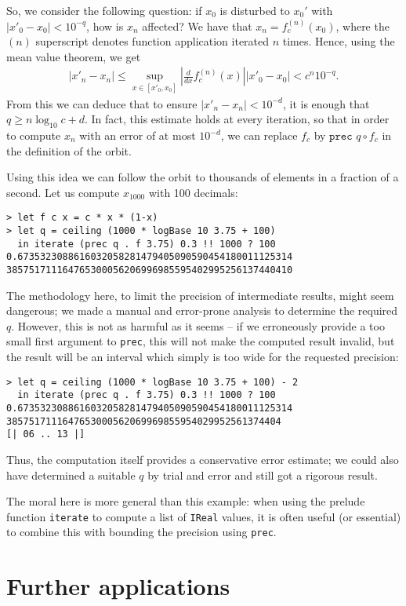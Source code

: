 \documentclass[9pt, a4, twocolumn]{article}
\begin{document}
So, we consider the following question: if $x_0$ is disturbed to $x_0'$ with
$|x'_0-x_0| < 10 ^{-q}$, how is $x_n$ affected? We have that $x_n =
f_c^{(n)}(x_0)$, where the $(n)$ superscript denotes function
application iterated $n$ times. Hence, using the mean value theorem, we get
\begin{align*}
|x'_n -
 x_n| \leq \sup_{x \in [x'_0,x_0]} \left| \frac{d}{dx}
   f_c^{(n)}(x)\right|  |x'_0 - x_0| < c^n  10 ^{-q}.    
\end{align*}
From this we can deduce that to ensure $|x'_n - x_n| < 10^{-d}$, it is
enough that $q \geq n \log_{10} c + d$. In fact, this estimate holds at
every iteration, so that in order to compute $x_n$ with an error of at
most $10^{-d}$, we can replace $f_c$ by $\texttt{prec } q \circ f_c$ in the
definition of the orbit.  

Using this idea we can follow the orbit to thousands of elements in a
fraction of a second. Let us compute $x_{1000}$ with 100 decimals:
\begin{verbatim}
> let f c x = c * x * (1-x)
> let q = ceiling (1000 * logBase 10 3.75 + 100) 
  in iterate (prec q . f 3.75) 0.3 !! 1000 ? 100
0.6735323088616032058281479405090590454180011125314
385751711164765300056206996985595402995256137440410
\end{verbatim}
The methodology here, to limit the precision of intermediate results, might 
seem dangerous; we made a manual and error-prone analysis to determine the
required $q$. However, this is not as harmful as it seems -- if we erroneously 
provide a too small first argument to \texttt{prec},  this will not make the
computed result invalid, but the result will be an interval which
simply is too wide for the requested precision:
\begin{verbatim}
> let q = ceiling (1000 * logBase 10 3.75 + 100) - 2 
  in iterate (prec q . f 3.75) 0.3 !! 1000 ? 100
0.6735323088616032058281479405090590454180011125314
3857517111647653000562069969855954029952561374404
[| 06 .. 13 |]
\end{verbatim}
Thus, the computation itself provides a conservative error estimate; 
we could also have determined a suitable $q$ by trial and error and 
still got a rigorous result.

The moral here is more general than this example:
 when using the prelude function
\texttt{iterate} to compute a list of \texttt{IReal} values, 
it is often useful (or essential) to combine this with bounding the
precision using \texttt{prec}.

\section{Further applications}
\end{document}
